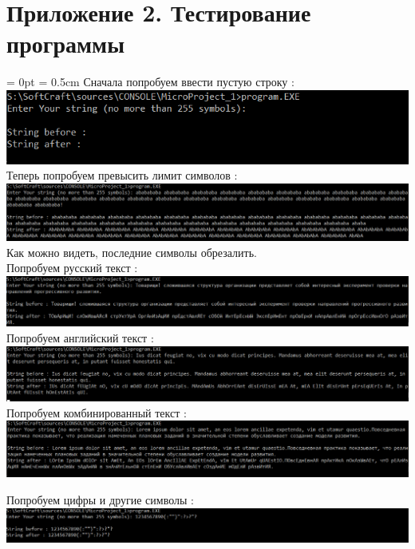 \documentclass[14pt,a4paper]{article}
\begin{document}
    \section{Приложение 2. Тестирование программы}\par{
        \parindent = 0pt
        \parskip = 0.5cm
        Сначала попробуем ввести пустую строку :\\
        \includegraphics[width=175mm]{Test_0}\\
        
        Теперь попробуем превысить лимит символов :\\
        \includegraphics[width=175mm]{Test_1}\\
        Как можно видеть, последние символы обрезалить.\\

        Попробуем русский текст :\\
        \includegraphics[width=175mm]{Test_2}\\

        Попробуем английский текст : \\
        \includegraphics[width=175mm]{Test_3}\\

        Попробуем комбинированный текст :\\
        \includegraphics[width=175mm]{Test_4}

        Попробуем цифры и другие символы :\\
        \includegraphics[width=175mm]{Test_5.png}
    }
    
\end{document}
